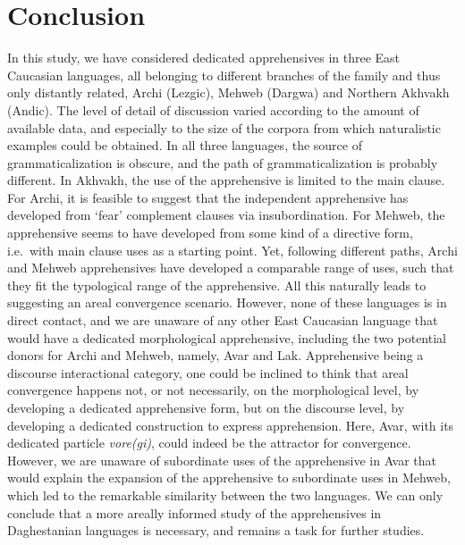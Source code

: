 \documentclass[output=paper,colorlinks,citecolor=brown]{langscibook}
\begin{document}
\section{Conclusion}
\label{daniel:conclusion}
 
In this study, we have considered dedicated apprehensives in three East Caucasian languages, all  belonging to different branches of the family and thus only distantly related, Archi (Lezgic), Mehweb (Dargwa) and Northern Akhvakh (Andic). The level of detail of discussion varied according to the amount of available data, and especially to the size of the corpora from which naturalistic examples could be obtained. In all three languages, the source of grammaticalization is obscure, and the path of grammaticalization is probably different. In Akhvakh, the use of the apprehensive is limited to the main clause. For Archi, it is feasible to suggest that the independent apprehensive has developed from `fear' complement clauses via insubordination. For Mehweb, the apprehensive seems to have developed from some kind of a directive form, i.e.\   with main clause uses as a starting point. Yet, following different paths, Archi and Mehweb apprehensives have developed a comparable range of uses, such that they fit the typological range of the apprehensive. All this naturally leads to suggesting an areal convergence scenario. However, none of these languages is in direct contact, and we are unaware of any other East Caucasian language that would have a dedicated morphological apprehensive, including the two potential donors for Archi and Mehweb, namely, Avar and Lak. Apprehensive being a discourse interactional category, one could be inclined to think that areal convergence happens not, or not necessarily, on the morphological level, by developing a dedicated apprehensive form, but on the discourse level, by developing a dedicated construction to express apprehension. Here, Avar, with its dedicated particle \textit{vore(gi)}, could indeed be the attractor for convergence. However, we are unaware of subordinate uses of the apprehensive in Avar that would explain the expansion of the apprehensive to subordinate uses in Mehweb, which led to the remarkable similarity between the two languages. We can only conclude that a more areally informed study of the apprehensives in Daghestanian languages is necessary, and remains a task for further studies. 
\end{document}
